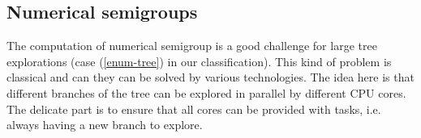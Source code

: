 \documentclass{deliverablereport}
\newcommand{\CilkP}{\texttt{Cilk++}\xspace}
\begin{document}




\subsection{Numerical semigroups}
\label{subsec:numerical-semigroups}

The computation of numerical semigroup is a good challenge for large tree
explorations (case (\ref{enum-tree}) in our
classification). This kind of problem is classical and can they can be solved by
various technologies. The idea here is that different branches of the
tree can be explored in parallel by different CPU cores. The
delicate part is to ensure that all cores can be provided with tasks,
i.e. always having a new branch to explore.
\end{document}
